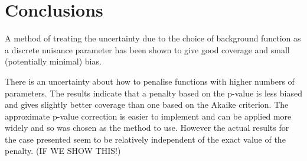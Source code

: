 \section{Conclusions} %
\label{sec:conclusions}

A method of treating the uncertainty due to the choice of background function
as a discrete nuisance parameter has been shown to give good coverage and
small (potentially minimal) bias.

There is an uncertainty about how to penalise functions with higher numbers
of parameters. The results indicate that a penalty based on the p-value
is less biased and gives slightly better coverage than one based on the
Akaike criterion. The approximate p-value correction is easier to implement and
can be applied more widely and so was chosen as the method to use.
However the actual results for the case presented
seem to be relatively independent of the exact value of the penalty. (IF WE SHOW THIS!)


